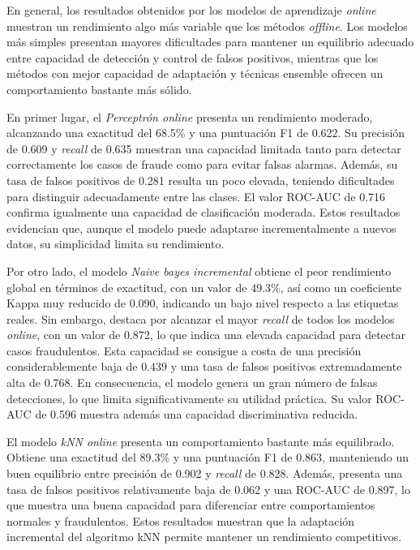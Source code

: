 \documentclass[12pt,a4paper]{report}
\begin{document}
En general, los resultados obtenidos por los modelos de aprendizaje \emph{online} muestran un rendimiento algo más variable que los métodos \emph{offline}. Los modelos más simples presentan mayores dificultades para mantener un equilibrio adecuado entre capacidad de detección y control de falsos positivos, mientras que los métodos con mejor capacidad de adaptación y técnicas ensemble ofrecen un comportamiento bastante más sólido.

En primer lugar, el \emph{Perceptrón online} presenta un rendimiento moderado, alcanzando una exactitud del 68.5\% y una puntuación F1 de 0.622. Su precisión de 0.609 y \emph{recall} de 0.635 muestran una capacidad limitada tanto para detectar correctamente los casos de fraude como para evitar falsas alarmas. Además, su tasa de falsos positivos de 0.281 resulta un poco elevada, teniendo dificultades para distinguir adecuadamente entre las clases. El valor ROC-AUC de 0.716 confirma igualmente una capacidad de clasificación moderada. Estos resultados evidencian que, aunque el modelo puede adaptarse incrementalmente a nuevos datos, su simplicidad limita su rendimiento.

Por otro lado, el modelo \emph{Naive bayes incremental} obtiene el peor rendimiento global en términos de exactitud, con un valor de 49.3\%, así como un coeficiente Kappa muy reducido de 0.090, indicando un bajo nivel respecto a las etiquetas reales. Sin embargo, destaca por alcanzar el mayor \emph{recall} de todos los modelos \emph{online}, con un valor de 0.872, lo que indica una elevada capacidad para detectar casos fraudulentos. Esta capacidad se consigue a costa de una precisión considerablemente baja de 0.439 y una tasa de falsos positivos extremadamente alta de 0.768. En consecuencia, el modelo genera un gran número de falsas detecciones, lo que limita significativamente su utilidad práctica. Su valor ROC-AUC de 0.596 muestra además una capacidad discriminativa reducida.

El modelo \emph{kNN online} presenta un comportamiento bastante más equilibrado. Obtiene una exactitud del 89.3\% y una puntuación F1 de 0.863, manteniendo un buen equilibrio entre precisión de 0.902 y \emph{recall} de 0.828. Además, presenta una tasa de falsos positivos relativamente baja de 0.062 y una ROC-AUC de 0.897, lo que muestra una buena capacidad para diferenciar entre comportamientos normales y fraudulentos. Estos resultados muestran que la adaptación incremental del algoritmo kNN permite mantener un rendimiento competitivos.
\end{document}
